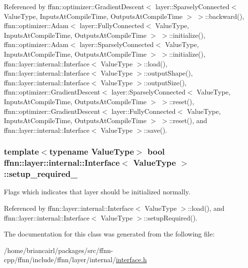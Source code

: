 Referenced by ffnn\-::optimizer\-::\-Gradient\-Descent$<$ layer\-::\-Sparsely\-Connected$<$ Value\-Type, Inputs\-At\-Compile\-Time, Outputs\-At\-Compile\-Time $>$ $>$\-::backward(), ffnn\-::optimizer\-::\-Adam$<$ layer\-::\-Fully\-Connected$<$ Value\-Type, Inputs\-At\-Compile\-Time, Outputs\-At\-Compile\-Time $>$ $>$\-::initialize(), ffnn\-::optimizer\-::\-Adam$<$ layer\-::\-Sparsely\-Connected$<$ Value\-Type, Inputs\-At\-Compile\-Time, Outputs\-At\-Compile\-Time $>$ $>$\-::initialize(), ffnn\-::layer\-::internal\-::\-Interface$<$ Value\-Type $>$\-::load(), ffnn\-::layer\-::internal\-::\-Interface$<$ Value\-Type $>$\-::output\-Shape(), ffnn\-::layer\-::internal\-::\-Interface$<$ Value\-Type $>$\-::output\-Size(), ffnn\-::optimizer\-::\-Gradient\-Descent$<$ layer\-::\-Sparsely\-Connected$<$ Value\-Type, Inputs\-At\-Compile\-Time, Outputs\-At\-Compile\-Time $>$ $>$\-::reset(), ffnn\-::optimizer\-::\-Gradient\-Descent$<$ layer\-::\-Fully\-Connected$<$ Value\-Type, Inputs\-At\-Compile\-Time, Outputs\-At\-Compile\-Time $>$ $>$\-::reset(), and ffnn\-::layer\-::internal\-::\-Interface$<$ Value\-Type $>$\-::save().

\hypertarget{classffnn_1_1layer_1_1internal_1_1_interface_a57f0de55599c9b6621a66096b5662ca8}{
\subsubsection[{setup\-\_\-required\-\_\-}]{\setlength{\rightskip}{0pt plus 5cm}template$<$typename Value\-Type$>$ bool {\bf ffnn\-::layer\-::internal\-::\-Interface}$<$ Value\-Type $>$\-::setup\-\_\-required\-\_\-\hspace{0.3cm}{\ttfamily [protected]}}}\label{classffnn_1_1layer_1_1internal_1_1_interface_a57f0de55599c9b6621a66096b5662ca8}


Flags which indicates that layer should be initialized normally. 



Referenced by ffnn\-::layer\-::internal\-::\-Interface$<$ Value\-Type $>$\-::load(), and ffnn\-::layer\-::internal\-::\-Interface$<$ Value\-Type $>$\-::setup\-Required().



The documentation for this class was generated from the following file\-:\begin{DoxyCompactItemize}
\item 
/home/briancairl/packages/src/ffnn-\/cpp/ffnn/include/ffnn/layer/internal/\hyperlink{interface_8h}{interface.\-h}\end{DoxyCompactItemize}
